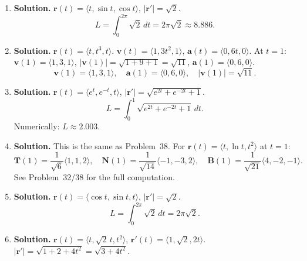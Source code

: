 \begin{enumerate}
Using a cubic Hermite interpolant with zero-velocity endpoints:
\[
s(t)=3t^2-2t^3, \quad \mathbf{r}(t)=2s(t)\langle 1,1,1\rangle = \langle 2(3t^2-2t^3),\; 2(3t^2-2t^3),\; 2(3t^2-2t^3)\rangle.
\]
Check: $\mathbf{r}(0)=\langle 0,0,0\rangle$, $\mathbf{r}(1)=\langle 2,2,2\rangle$.
$\mathbf{r}'(t)=2(6t-6t^2)\langle 1,1,1\rangle$, so $\mathbf{r}'(0)=\mathbf{r}'(1)=\mathbf{0}$ (smooth start/stop).
$\mathbf{r}''(t)=2(6-12t)\langle 1,1,1\rangle$ is continuous.

\[
\boxed{\mathbf{r}(t)=(6t^2-4t^3)\langle 1,1,1\rangle, \quad t\in[0,1].}
\]

\item \textbf{Solution.}
$\mathbf{r}(t)=\langle t, \sin t, \cos t\rangle$, $|\mathbf{r}'|=\sqrt{2}$.
\[
\boxed{L=\int_0^{2\pi}\sqrt{2}\,dt=2\pi\sqrt{2}\approx 8.886.}
\]

\item \textbf{Solution.}
$\mathbf{r}(t)=\langle t, t^3, t\rangle$.
$\mathbf{v}(t)=\langle 1, 3t^2, 1\rangle$, $\mathbf{a}(t)=\langle 0, 6t, 0\rangle$.
At $t=1$:
$\mathbf{v}(1)=\langle 1,3,1\rangle$, $|\mathbf{v}(1)|=\sqrt{1+9+1}=\sqrt{11}$, $\mathbf{a}(1)=\langle 0,6,0\rangle$.
\[
\boxed{\mathbf{v}(1)=\langle 1,3,1\rangle,\quad \mathbf{a}(1)=\langle 0,6,0\rangle,\quad |\mathbf{v}(1)|=\sqrt{11}.}
\]

\item \textbf{Solution.}
$\mathbf{r}(t)=\langle e^t, e^{-t}, t\rangle$, $|\mathbf{r}'|=\sqrt{e^{2t}+e^{-2t}+1}$.
\[
L=\int_0^1\sqrt{e^{2t}+e^{-2t}+1}\,dt.
\]
Numerically: $\boxed{L\approx 2.003.}$


\item \textbf{Solution.}
This is the same as Problem~38. For $\mathbf{r}(t)=\langle t, \ln t, t^2\rangle$ at $t=1$:
\[
\boxed{\mathbf{T}(1)=\frac{1}{\sqrt{6}}\langle 1,1,2\rangle,\quad \mathbf{N}(1)=\frac{1}{\sqrt{14}}\langle -1,-3,2\rangle,\quad \mathbf{B}(1)=\frac{1}{\sqrt{21}}\langle 4,-2,-1\rangle.}
\]
See Problem~32/38 for the full computation.

\item \textbf{Solution.}
$\mathbf{r}(t)=\langle \cos t, \sin t, t\rangle$, $|\mathbf{r}'|=\sqrt{2}$.
\[
\boxed{L=\int_0^{2\pi}\sqrt{2}\,dt=2\pi\sqrt{2}.}
\]

\item \textbf{Solution.}
$\mathbf{r}(t)=\langle t, \sqrt{2}\,t, t^2\rangle$, $\mathbf{r}'(t)=\langle 1, \sqrt{2}, 2t\rangle$.
$|\mathbf{r}'|=\sqrt{1+2+4t^2}=\sqrt{3+4t^2}$.


\end{enumerate}
